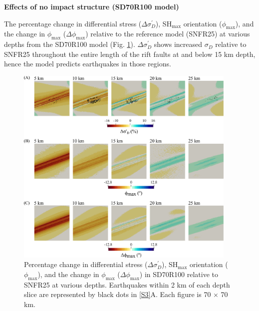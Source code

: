 \documentclass[draft,jgrga]{agutexSI2019}
\begin{document}
\begin{article}
\vspace{10mm} %


\noindent\textbf{Effects of no impact structure (SD70R100 model)}

 The percentage change in differential stress ($\Delta\sigma_{D}^{\prime}$), SH$_{\max}$ orientation ($\phi_{\max}$), and the change in $\phi_{\max}$ ($\Delta\phi_{\max}$) relative to the reference model (SNFR25) at various depths from the SD70R100 model (Fig. \ref{S4}).  $\Delta\sigma_{D}^{\prime}$ shows increased $\sigma_{D}$ relative to SNFR25 throughout the entire length of the rift faults at and below 15 km depth, hence the model predicts earthquakes in those regions. 

\vspace{10mm} %

\begin{figure}[ht]
\includegraphics[width=25pc]{Figures/SD70R100_S1.png}
\caption{Percentage change in differential stress ($\Delta\sigma_{D}^{\prime}$), SH$_{\max}$ orientation ($\phi_{\max}$), and the change in $\phi_{\max}$ ($\Delta\phi_{\max}$) in SD70R100 relative to SNFR25 at various depths. Earthquakes within 2 km of each depth slice are represented by black dots in \ref{S3}A. Each figure is 70 $\times$ 70 km.}
\label{S4}
\end{figure}


\end{article}
\end{document}
